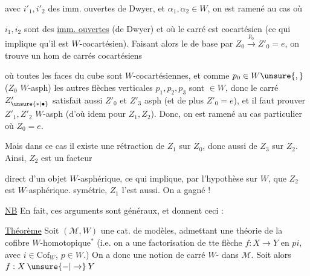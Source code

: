avec $i'_1,i'_2$ des imm. ouvertes de Dwyer, et $\alpha_1,\alpha_2\in W$, on est ramené au cas où

$i_1,i_2$ sont des \uline{imm. ouvertes} (de Dwyer) et où le carré est cocartésien (ce qui implique qu'il est $W$-cocartésien). Faisant alors le  de base par $Z_0\xrightarrow{p_0}Z'_0=e$, on trouve un  hom de carrés cocartésiens


où toutes les faces du cube sont $W$-cocartésiennes, et comme $p_0\in W\unsure{,}$ ($Z_0$  $W$-asph) les autres flèches verticales $p_1,p_2,p_3$ sont $\in W$, donc le carré $Z'_{\unsure{*|\bullet}}$ satisfait aussi $Z'_0$ et $Z'_3$ asph (et de plus $Z'_0=e$), et il faut prouver $Z'_1,Z'_2$ $W$-asph (d'où idem pour $Z_1,Z_2$). Donc, on est ramené au cas particulier où $Z_0=e$.

Mais dans ce cas il existe une rétraction  de $Z_1$ sur $Z_0$, donc aussi de $Z_3$ sur $Z_2$. Ainsi, $Z_2$ est un facteur

direct d'un objet $W$-asphérique, ce qui implique, par l'hypothèse sur $W$, que $Z_2$ est $W$-asphérique.  symétrie, $Z_1$ l'est aussi. On a gagné !

\uline{NB} En fait, ces arguments sont généraux, et donnent ceci :

\uline{Théorème} Soit $(\mathcal M,W)$ une cat. de modèles, admettant une théorie de la cofibre $W$-homotopique\({}^{*}\) (i.e. on a une factorisation de tte flèche $f:X\longrightarrow Y$ en $pi$, avec $i\in\mathrm{Cof}_W$, $p\in W$.)  On a donc une notion de carré $W$- dans $\mathcal M$. Soit alors $f:X\mathbin{\unsure{-|\to}}Y$

